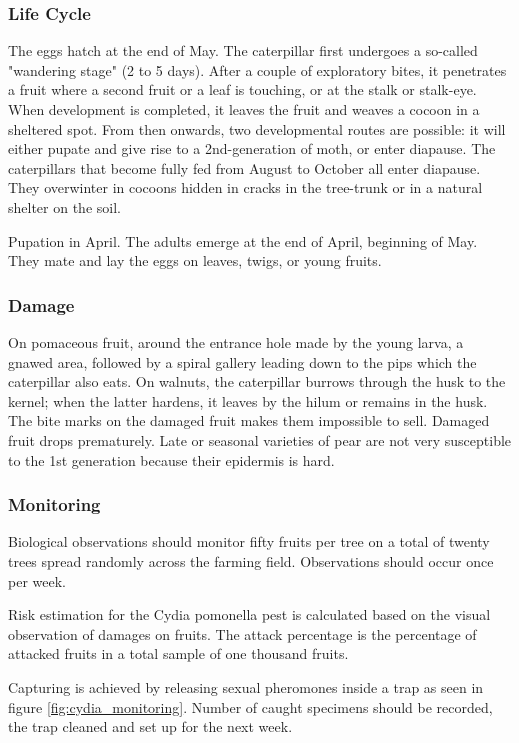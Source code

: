 \subsubsection{Life Cycle}

The eggs hatch at the end of May. The caterpillar first undergoes a so-called "wandering stage" (2 to 5 days). After a couple of exploratory bites, it penetrates a fruit where a second fruit or a leaf is touching, or at the stalk or stalk-eye. When development is completed, it leaves the fruit and weaves a cocoon in a sheltered spot. From then onwards, two developmental routes are possible: it will either pupate and give rise to a 2nd-generation of moth, or enter diapause. The caterpillars that become fully fed from August to October all enter diapause. They overwinter in cocoons hidden in cracks in the tree-trunk or in a natural shelter on the soil.

Pupation in April. The adults emerge at the end of April, beginning of May. They mate and lay the eggs on leaves, twigs, or young fruits.

\subsubsection{Damage}

On pomaceous fruit, around the entrance hole made by the young larva, a gnawed area, followed by a spiral gallery leading down to the pips which the caterpillar also eats. On walnuts, the caterpillar burrows through the husk to the kernel; when the latter hardens, it leaves by the hilum or remains in the husk. The bite marks on the damaged fruit makes them impossible to sell. Damaged fruit drops prematurely.
Late or seasonal varieties of pear are not very susceptible to the 1st generation because their epidermis is hard.

\subsubsection{Monitoring}

Biological observations should monitor fifty fruits per tree on a total of twenty trees spread randomly across the farming field. Observations should occur once per week. 

Risk estimation for the Cydia pomonella pest is calculated based on the visual observation of damages on fruits. The attack percentage is the percentage of attacked fruits in a total sample of one thousand fruits. 

Capturing is achieved by releasing sexual pheromones inside a trap as seen in figure \ref{fig:cydia_monitoring}. Number of caught specimens should be recorded, the trap cleaned and set up for the next week.


